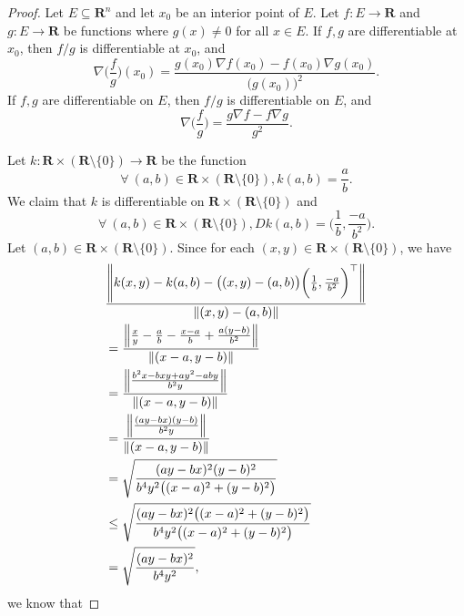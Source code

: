 \begin{proof}
    Let \(E \subseteq \mathbf{R}^n\) and let \(x_0\) be an interior point of \(E\).
    Let \(f : E \to \mathbf{R}\) and \(g : E \to \mathbf{R}\) be functions where \(g(x) \neq 0\) for all \(x \in E\).
    If \(f, g\) are differentiable at \(x_0\), then \(f / g\) is differentiable at \(x_0\), and
    \[
        \nabla \bigg(\frac{f}{g}\bigg)(x_0) = \frac{g(x_0) \nabla f(x_0) - f(x_0) \nabla g(x_0)}{\big(g(x_0)\big)^2}.
    \]
    If \(f, g\) are differentiable on \(E\), then \(f / g\) is differentiable on \(E\), and
    \[
        \nabla \bigg(\frac{f}{g}\bigg) = \frac{g \nabla f - f \nabla g}{g^2}.
    \]

    Let \(k : \mathbf{R} \times (\mathbf{R} \setminus \{0\}) \to \mathbf{R}\) be the function
    \[
        \forall\ (a, b) \in \mathbf{R} \times (\mathbf{R} \setminus \{0\}), k(a, b) = \frac{a}{b}.
    \]
    We claim that \(k\) is differentiable on \(\mathbf{R} \times (\mathbf{R} \setminus \{0\})\) and
    \[
        \forall\ (a, b) \in \mathbf{R} \times (\mathbf{R} \setminus \{0\}), D k(a, b) = \bigg(\frac{1}{b}, \frac{-a}{b^2}\bigg).
    \]
    Let \((a, b) \in \mathbf{R} \times (\mathbf{R} \setminus \{0\})\).
    Since for each \((x, y) \in \mathbf{R} \times (\mathbf{R} \setminus \{0\})\), we have
    \begin{align*}
         & \frac{\norm*{k(x, y) - k(a, b) - \big((x, y) - (a, b)\big) \bigg(\frac{1}{b}, \frac{-a}{b^2}\bigg)^\top}}{\norm*{(x, y) - (a, b)}} \\
         & = \frac{\norm*{\frac{x}{y} - \frac{a}{b} - \frac{x - a}{b} + \frac{a(y - b)}{b^2}}}{\norm*{(x - a, y - b)}}                        \\
         & = \frac{\norm*{\frac{b^2 x - bxy + ay^2 - aby}{b^2y}}}{\norm*{(x - a, y - b)}}                                                     \\
         & = \frac{\norm*{\frac{(ay - bx)(y - b)}{b^2y}}}{\norm*{(x - a, y - b)}}                                                             \\
         & = \sqrt{\frac{(ay - bx)^2 (y - b)^2}{b^4 y^2 \big((x - a)^2 + (y - b)^2\big)}}                                                     \\
         & \leq \sqrt{\frac{(ay - bx)^2 \big((x - a)^2 + (y - b)^2\big)}{b^4 y^2 \big((x - a)^2 + (y - b)^2\big)}}                            \\
         & = \sqrt{\frac{(ay - bx)^2}{b^4 y^2}},
    \end{align*}
    we know that

\end{proof}
